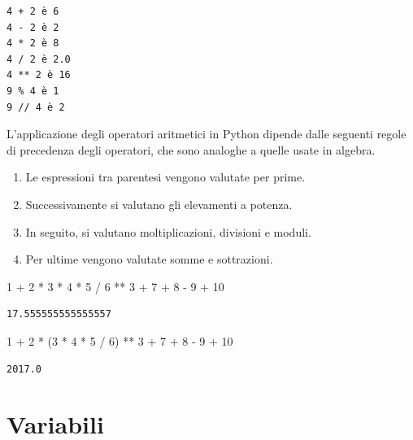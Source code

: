 \documentclass[
  letterpaper,
  krantz2]{{[}./krantz{]}}
\newenvironment{Shaded}{\begin{snugshade}}{\end{snugshade}}
\newcommand{\DecValTok}[1]{\textcolor[rgb]{0.68,0.00,0.00}{#1}}
\newcommand{\NormalTok}[1]{\textcolor[rgb]{0.00,0.23,0.31}{#1}}
\newcommand{\OperatorTok}[1]{\textcolor[rgb]{0.37,0.37,0.37}{#1}}
\providecommand{\tightlist}{%
  \setlength{\itemsep}{0pt}\setlength{\parskip}{0pt}}\usepackage{longtable,booktabs,array}
\begin{document}
\begin{verbatim}
4 + 2 è 6
4 - 2 è 2
4 * 2 è 8
4 / 2 è 2.0
4 ** 2 è 16
9 % 4 è 1
9 // 4 è 2
\end{verbatim}

L'applicazione degli operatori aritmetici in Python dipende dalle
seguenti regole di precedenza degli operatori, che sono analoghe a
quelle usate in algebra.

\begin{enumerate}
\def\labelenumi{\arabic{enumi}.}
\tightlist
\item
  Le espressioni tra parentesi vengono valutate per prime.
\item
  Successivamente si valutano gli elevamenti a potenza.
\item
  In seguito, si valutano moltiplicazioni, divisioni e moduli.
\item
  Per ultime vengono valutate somme e sottrazioni.
\end{enumerate}

\begin{Shaded}
\begin{Highlighting}[]
\DecValTok{1} \OperatorTok{+} \DecValTok{2} \OperatorTok{*} \DecValTok{3} \OperatorTok{*} \DecValTok{4} \OperatorTok{*} \DecValTok{5} \OperatorTok{/} \DecValTok{6} \OperatorTok{**} \DecValTok{3} \OperatorTok{+} \DecValTok{7} \OperatorTok{+} \DecValTok{8} \OperatorTok{{-}} \DecValTok{9} \OperatorTok{+} \DecValTok{10}
\end{Highlighting}
\end{Shaded}

\begin{verbatim}
17.555555555555557
\end{verbatim}

\begin{Shaded}
\begin{Highlighting}[]
\DecValTok{1} \OperatorTok{+} \DecValTok{2} \OperatorTok{*}\NormalTok{ (}\DecValTok{3} \OperatorTok{*} \DecValTok{4} \OperatorTok{*} \DecValTok{5} \OperatorTok{/} \DecValTok{6}\NormalTok{) }\OperatorTok{**} \DecValTok{3} \OperatorTok{+} \DecValTok{7} \OperatorTok{+} \DecValTok{8} \OperatorTok{{-}} \DecValTok{9} \OperatorTok{+} \DecValTok{10}
\end{Highlighting}
\end{Shaded}

\begin{verbatim}
2017.0
\end{verbatim}

\section{Variabili}\label{variabili}
\end{document}
